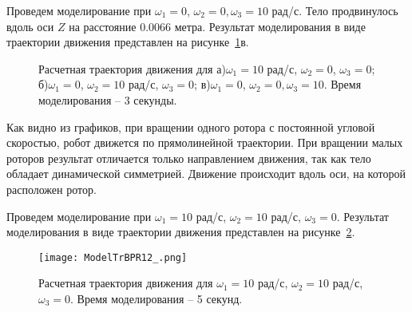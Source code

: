 Проведем моделирование при $\omega_1=0$, $\omega_2=0, \omega_3=10$ рад/с. Тело продвинулось вдоль оси $Z$ на расстояние 0.0066 метра. Результат моделирования в виде траектории движения представлен на рисунке~\ref{ModelTrBPR}в.

\begin{figure}[!ht]
	\begin{minipage}[h]{0.3\linewidth}
	\end{minipage}
	\hfill
	\begin{minipage}[h]{0.3\linewidth}
	\end{minipage}
	\hfill
	\begin{minipage}[h]{0.3\linewidth}
	\end{minipage}

	\begin{minipage}[h]{0.3\linewidth}
	\end{minipage}
	\hfill
	\begin{minipage}[h]{0.3\linewidth}
	\end{minipage}
	\hfill
	\begin{minipage}[h]{0.3\linewidth}
	\end{minipage}
	
	\caption{Расчетная траектория движения для а)$\omega_1=10$ рад/с, $\omega_2=0$, $\omega_3=0$; б)$\omega_1=0$, $\omega_2=10$ рад/с, $\omega_3=0$; в)$\omega_1=0$, $\omega_2=0, \omega_3=10$. Время моделирования -- 3 секунды.}
	\label{ModelTrBPR}
\end{figure}

Как видно из графиков, при вращении одного ротора с постоянной угловой скоростью, робот движется по прямолинейной траектории. При вращении малых роторов результат отличается только направлением движения, так как тело обладает динамической симметрией. Движение происходит вдоль оси, на которой расположен ротор.

Проведем моделирование при $\omega_1=10$ рад/с, $\omega_2=10$ рад/с, $\omega_3=0$. Результат моделирования в виде траектории движения представлен на рисунке~\ref{ModelTrBPR12}.

\begin{figure}[h]
	\centering
	\texttt{[image: ModelTrBPR12\_.png]}%
	\caption{Расчетная траектория движения для $\omega_1=10$ рад/с, $\omega_2=10$ рад/с, $\omega_3=0$. Время моделирования -- 5 секунд.}
	\label{ModelTrBPR12}
\end{figure}

